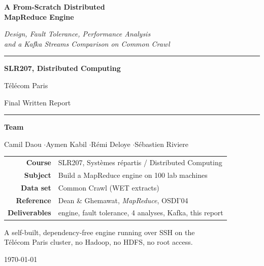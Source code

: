 \documentclass[11pt,a4paper]{article}
\begin{document}
\begin{titlepage}
\centering
\vspace*{1.5cm}
{\Huge\bfseries A From-Scratch Distributed\\[0.3cm] MapReduce Engine\par}
\vspace{0.6cm}
{\Large\itshape Design, Fault Tolerance, Performance Analysis\\ and a Kafka Streams Comparison on Common Crawl\par}
\vspace{1.2cm}
\rule{0.8\textwidth}{0.8pt}\par
\vspace{0.5cm}
{\large \textbf{SLR207, Distributed Computing}\par}
{\large Télécom Paris\par}
\vspace{0.4cm}
{\large Final Written Report\par}
\rule{0.8\textwidth}{0.8pt}\par
\vspace{1.2cm}

{\large\textbf{Team}\par}
\vspace{0.3cm}
{\large Camil Daou \quad$\cdot$\quad Aymen Kabil \quad$\cdot$\quad Rémi Deloye \quad$\cdot$\quad Sébastien Riviere\par}
\vspace{1.4cm}

\begin{tabular}{rl}
\textbf{Course} & SLR207, Systèmes répartis / Distributed Computing\\[4pt]
\textbf{Subject} & Build a MapReduce engine on 100 lab machines\\[4pt]
\textbf{Data set} & Common Crawl (WET extracts)\\[4pt]
\textbf{Reference} & Dean \& Ghemawat, \emph{MapReduce}, OSDI'04\\[4pt]
\textbf{Deliverables} & engine, fault tolerance, 4 analyses, Kafka, this report\\
\end{tabular}

\vfill
{\large A self-built, dependency-free engine running over SSH on the\\
Télécom Paris cluster, no Hadoop, no HDFS, no root access.\par}
\vspace{1cm}
{\small \today}
\end{titlepage}
\end{document}
